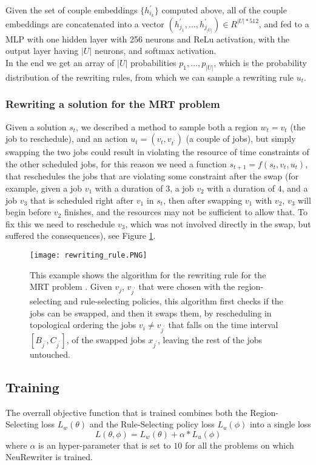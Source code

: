 \documentclass[12pt]{article}
\begin{document}
Given the set of couple embeddings $\{h^{'}_{i_k}\}$ computed above, all of the couple embeddings are concatenated into a vector $(h^{'}_{j_1},\dots,h^{'}_{j_{|U|}}) \in R^{|U|*512}$, and fed to a MLP with one hidden layer with 256 neurons and ReLu activation, with the output layer having $|U|$ neurons, and softmax activation.\\
In the end we get an array of $|U|$ probabilities $p_1,\dots,p_{|U|}$, which is the probability distribution of the rewriting rules, from which we can sample a rewriting rule $u_t$.

\subsubsection{Rewriting a solution for the MRT problem}
\label{sec:rewriting_step}
Given a solution $s_t$, we described a method to sample both a region $w_t=v_t$ (the job to reschedule), and an action $u_t = (v_t,v_{t^{'}})$ (a couple of jobs), but simply swapping the two jobs could result in violating the 
resource of time constraints of the other scheduled jobs, for this reason we need a function $s_{t+1} = f(s_t,v_t,u_t)$, that reschedules the jobs that are violating some constraint after the swap 
(for example, given a job $v_1$ with a duration of $3$, a job $v_2$ with a duration of $4$, and a job $v_3$ that is scheduled right after $v_1$ in $s_t$, then after swapping $v_1$ with $v_2$, 
 $v_3$ will begin before $v_2$ finishes, and the resources may not be sufficient to allow that. To fix this we need to reschedule $v_3$, which was not involved directly in the swap, but suffered the consequences), see Figure \ref{img:rewriting_rule}.\\

\begin{figure}[H]
    \centering
    \texttt{[image: rewriting\_rule.PNG]}
    \caption{This example shows the algorithm for the rewriting rule for the MRT problem \cite{neu_rewriter}. Given $v_j$, $v_{j^{'}}$ that were chosen with the region-selecting and rule-selecting policies, this algorithm first checks if the jobs can be swapped, and then it swaps them, by rescheduling in topological ordering the jobs $v_i \neq v_{j^{'}}$ that falls on the time interval $[B_{j^{'}},C_{j^{'}}]$, of the swapped jobs $x_{j^{'}}$, leaving the rest of the jobs untouched.}
    \label{img:rewriting_rule}
\end{figure}

\subsection{Training}
\label{sec:repairing_train}
The overrall objective function that is trained combines both the Region-Selecting loss $L_w(\theta)$ and the Rule-Selecting policy loss $L_u(\phi)$ into a single loss $$L(\theta,\phi) = L_w(\theta) + \alpha*L_u(\phi)$$ where $\alpha$ is an hyper-parameter that is set to $10$ for all the problems on which NeuRewriter is trained.
\end{document}
